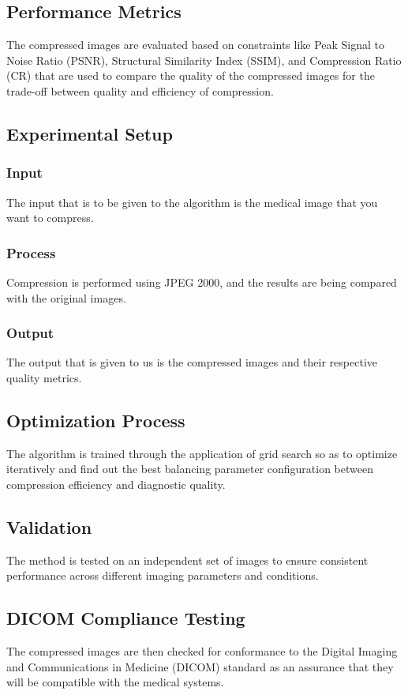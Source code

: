 \documentclass[conference,letterpaper]{IEEEtran}
\begin{document}
\subsection{Performance Metrics}
The compressed images are evaluated based on constraints like Peak Signal to Noise Ratio (PSNR), Structural Similarity Index (SSIM), and Compression Ratio (CR) that are used to compare the quality of the compressed images for the trade-off between quality and efficiency of compression.

\subsection{Experimental Setup}

\subsubsection{Input}
The input that is to be given to the algorithm is the medical image that you want to compress.

\subsubsection{Process}
Compression is performed using JPEG 2000, and the results are being compared with the original images.

\subsubsection{Output}
The output that is given to us is the compressed images and their respective quality metrics.

\subsection{Optimization Process}
The algorithm is trained through the application of grid search so as to optimize iteratively and find out the best balancing parameter configuration between compression efficiency and diagnostic quality.

\subsection{Validation}
The method is tested on an independent set of images to ensure consistent performance across different imaging parameters and conditions.

\subsection{DICOM Compliance Testing}
The compressed images are then checked for conformance to the Digital Imaging and Communications in Medicine (DICOM) standard as an assurance that they will be compatible with the medical systems.
\end{document}
